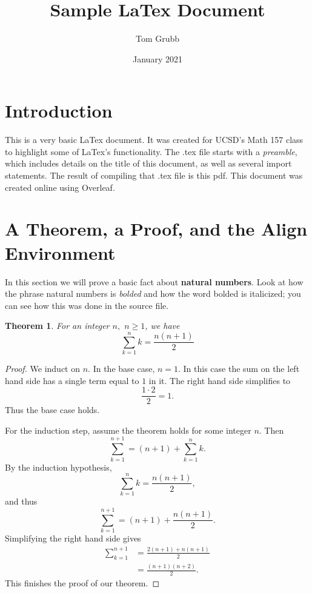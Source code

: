 \documentclass[11pt]{article}
\title{Sample LaTex Document}
\author{Tom Grubb}
\date{January 2021}
\newtheorem{theorem}{Theorem}[section]
\begin{document}
\maketitle


\section{Introduction}
This is a very basic LaTex document. It was created for UCSD's Math 157 class to highlight some of LaTex's functionality. The .tex file starts with a \emph{preamble}, which includes details on the title of this document, as well as several import statements. The result of compiling that .tex file is this pdf. This document was created online using Overleaf.

\section{A Theorem, a Proof, and the Align Environment}
In this section we will prove a basic fact about \textbf{natural numbers}. Look at how the phrase natural numbers is \emph{bolded} and how the word bolded is italicized; you can see how this was done in the source file.

\begin{theorem}
For an integer $n,$ $n\geq 1$, we have 
$$
\sum_{k = 1}^{n} k = \frac{n(n+1)}{2}
$$
\end{theorem}

\begin{proof}
We induct on $n$. In the base case, $n=1$. In this case the sum on the left hand side has a single term equal to $1$ in it. The right hand side simplifies to 
$$
\frac{1\cdot 2}{2} = 1.
$$
Thus the base case holds. 

For the induction step, assume the theorem holds for some integer $n$. Then 
$$
\sum_{k=1}^{n+1} = (n+1) + \sum_{k=1}^nk.
$$
By the induction hypothesis, 
$$
\sum_{k=1}^{n}k = \frac{n(n+1)}{2},
$$
and thus 
$$
\sum_{k=1}^{n+1} = (n+1)+ \frac{n(n+1)}{2}.
$$
Simplifying the right hand side gives 
\begin{align*}
\sum_{k=1}^{n+1} &= \frac{2(n+1)+n(n+1)}{2} \\
&=\frac{(n+1)(n+2)}{2}.
\end{align*}
This finishes the proof of our theorem.
\end{proof}
\end{document}
